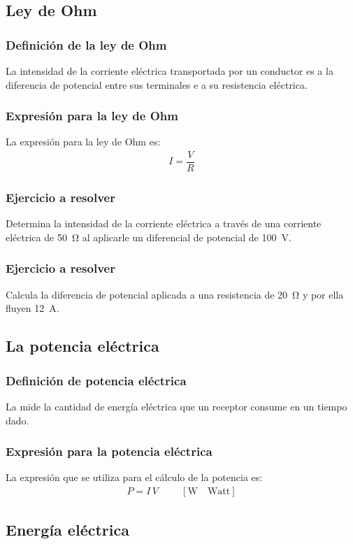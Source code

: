 \documentclass[14pt]{beamer}
\begin{document}
\subsection{Ley de Ohm}


\begin{frame}
\frametitle{Definición de la ley de Ohm}
La intensidad de la corriente eléctrica transportada por un conductor es  a la diferencia de potencial entre sus terminales \pause e  a su resistencia eléctrica.
\end{frame}
\begin{frame}
\frametitle{Expresión para la ley de Ohm}
La expresión para la ley de Ohm es:
\pause
\begin{align*}
I = \dfrac{V}{R}
\end{align*}
\end{frame}
\begin{frame}
\frametitle{Ejercicio a resolver}
Determina la intensidad de la corriente eléctrica a través de una corriente eléctrica de \SI{50}{\ohm} al aplicarle un diferencial de potencial de \SI{100}{\volt}.
\end{frame}
\begin{frame}
\frametitle{Ejercicio a resolver}
Calcula la diferencia de potencial aplicada a una resistencia de \SI{20}{\ohm} y por ella fluyen \SI{12}{\ampere}.
\end{frame}

\subsection{La potencia eléctrica}

\begin{frame}
\frametitle{Definición de potencia eléctrica}
La  mide la cantidad de energía eléctrica que un receptor consume en un tiempo dado.
\end{frame}
\begin{frame}
\frametitle{Expresión para la potencia eléctrica}
La expresión que se utiliza para el cálculo de la potencia es:
\pause
\begin{align*}
P = I \, V \hspace{1cm} \left[ \unit{\watt} \quad \text{Watt} \right]
\end{align*}
\end{frame}

\subsection{Energía eléctrica}
\end{document}
